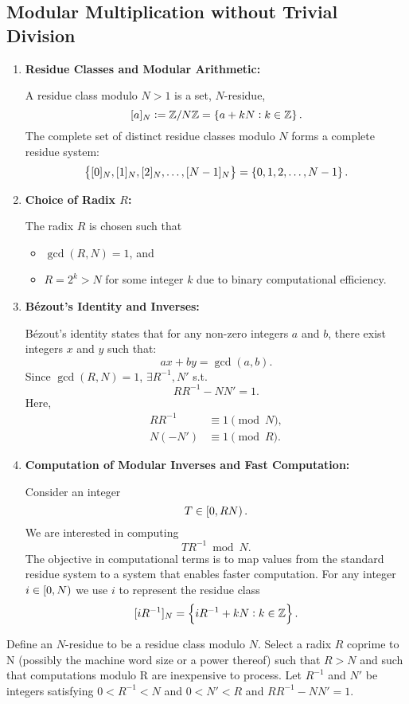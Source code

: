 \newpage
\subsection{Modular Multiplication without Trivial Division}

\begin{enumerate}[\bf 1.]
	\item \textbf{Residue Classes and Modular Arithmetic:}
	
	A residue class modulo $N>1$ is a set, $N$-residue, \[
	[a]_N:=\mathbb{Z}/N\mathbb{Z}=\set{a + kN: k\in\mathbb{Z}}.
	\]
	The complete set of distinct residue classes modulo $N$ forms a complete residue system: \[
	\set{[0]_N,[1]_N,[2]_N,\dots, [N-1]_N}=\set{0,1,2,\dots, N-1}.
	\]
	\item \textbf{Choice of Radix $R$:}
	
	The radix $R$ is chosen such that 
	\begin{itemize}
		\item $\gcd(R,N)=1$, and
		\item $R=2^k>N$ for some integer $k$ due to binary computational efficiency. 
	\end{itemize}
	\item \textbf{Bézout's Identity and Inverses:}
	
	Bézout's identity states that for any non-zero integers $a$ and $b$, there exist integers $x$ and $y$ such that: \[
	ax+by=\gcd(a,b).
	\] Since $\gcd(R,N)=1$, $\exists R^{-1}, N'$ s.t. \[
	RR^{-1}-NN'=1.
	\] Here, \begin{align*}
		RR^{-1}&\equiv 1\pmod{N},\\
		N(-N')&\equiv 1\pmod{R}.
	\end{align*}
	\item \textbf{Computation of Modular Inverses and Fast Computation:}
	
	Consider an integer \[
	T\in\intco{0,RN}.
	\] We are interested in computing \[
	TR^{-1}\bmod{N}.
	\] The objective in computational terms is to map values from the standard residue system to a system that enables faster computation. For any integer $i\in\intco{0,N}$ we use $i$ to represent the residue class 
	\[
	[iR^{-1}]_N=\set{iR^{-1}+kN:k\in\mathbb{Z}}.
	\]
\end{enumerate}


Define an $N$-residue to be a residue class modulo $N$. Select a radix $R$
coprime to N (possibly the machine word size or a power thereof) such that $R > N$
and such that computations modulo R are inexpensive to process. Let $R^{-1}$ and $N'$ be
integers satisfying $0 < R^{-1} < N$ and $0 < N' < R$ and $RR^{-1} - NN' = 1$.


